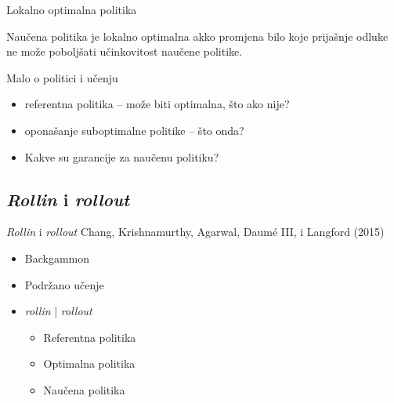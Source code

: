 \documentclass{beamer}
\begin{document}
\begin{frame}{Lokalno optimalna politika}
  \begin{definition}

    Naučena politika je lokalno optimalna akko promjena bilo koje prijašnje
    odluke ne može poboljšati učinkovitost naučene politike.

  \end{definition}
\end{frame}

\begin{frame}{Malo o politici i učenju}
\begin{itemize}
  \item referentna politika -- može biti optimalna, što ako nije?
  \item oponašanje suboptimalne politike -- što onda?
  \item Kakve su garancije za naučenu politiku?
\end{itemize}
\end{frame}


\subsection{\protect\textit{Rollin} i \protect\textit{rollout}}

\begin{frame}{\protect\textit{Rollin} i \protect\textit{rollout}}
{Chang, Krishnamurthy, Agarwal, Daumé III, i Langford (2015)}
  \begin{itemize}
  \item Backgammon
  \item Podržano učenje
  \item \textit{rollin} | \textit{rollout}
  \begin{itemize}
    \item Referentna politika
    \item Optimalna politika
    \item Naučena politika
  \end{itemize}
  \end{itemize}
\end{frame}
\end{document}
